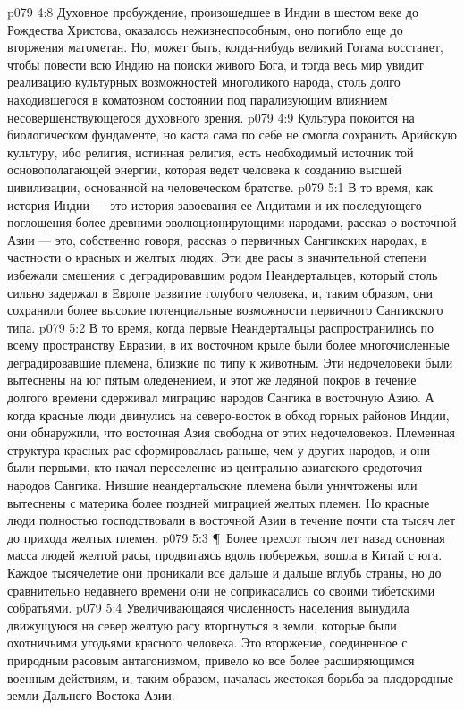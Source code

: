 \vs p079 4:8 Духовное пробуждение, произошедшее в Индии в шестом веке до Рождества Христова, оказалось нежизнеспособным, оно погибло еще до вторжения магометан. Но, может быть, когда\hyp{}нибудь великий Готама восстанет, чтобы повести всю Индию на поиски живого Бога, и тогда весь мир увидит реализацию культурных возможностей многоликого народа, столь долго находившегося в коматозном состоянии под парализующим влиянием несовершенствующегося духовного зрения.
\vs p079 4:9 Культура покоится на биологическом фундаменте, но каста сама по себе не смогла сохранить Арийскую культуру, ибо религия, истинная религия, есть необходимый источник той основополагающей энергии, которая ведет человека к созданию высшей цивилизации, основанной на человеческом братстве.
\vs p079 5:1 В то время, как история Индии --- это история завоевания ее Андитами и их последующего поглощения более древними эволюционирующими народами, рассказ о восточной Азии --- это, собственно говоря, рассказ о первичных Сангикских народах, в частности о красных и желтых людях. Эти две расы в значительной степени избежали смешения с деградировавшим родом Неандертальцев, который столь сильно задержал в Европе развитие голубого человека, и, таким образом, они сохранили более высокие потенциальные возможности первичного Сангикского типа.
\vs p079 5:2 В то время, когда первые Неандертальцы распространились по всему пространству Евразии, в их восточном крыле были более многочисленные деградировавшие племена, близкие по типу к животным. Эти недочеловеки были вытеснены на юг пятым оледенением, и этот же ледяной покров в течение долгого времени сдерживал миграцию народов Сангика в восточную Азию. А когда красные люди двинулись на северо\hyp{}восток в обход горных районов Индии, они обнаружили, что восточная Азия свободна от этих недочеловеков. Племенная структура красных рас сформировалась раньше, чем у других народов, и они были первыми, кто начал переселение из центрально\hyp{}азиатского средоточия народов Сангика. Низшие неандертальские племена были уничтожены или вытеснены с материка более поздней миграцией желтых племен. Но красные люди полностью господствовали в восточной Азии в течение почти ста тысяч лет до прихода желтых племен.
\vs p079 5:3 \P\ Более трехсот тысяч лет назад основная масса людей желтой расы, продвигаясь вдоль побережья, вошла в Китай с юга. Каждое тысячелетие они проникали все дальше и дальше вглубь страны, но до сравнительно недавнего времени они не соприкасались со своими тибетскими собратьями.
\vs p079 5:4 Увеличивающаяся численность населения вынудила движущуюся на север желтую расу вторгнуться в земли, которые были охотничьими угодьями красного человека. Это вторжение, соединенное с природным расовым антагонизмом, привело ко все более расширяющимся военным действиям, и, таким образом, началась жестокая борьба за плодородные земли Дальнего Востока Азии.

